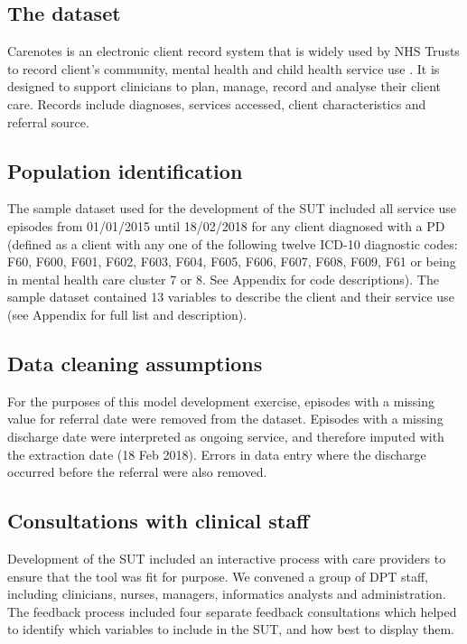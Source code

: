\documentclass{article}
\begin{document}
\subsection{The dataset}

Carenotes is an electronic client record system that is widely used by NHS Trusts to record client’s community, mental health and child health service use \cite{Advanced,BlueFrontier}. It is designed to support clinicians to plan, manage, record and analyse their client care. Records include diagnoses, services accessed, client characteristics and referral source.

\subsection{Population identification}
The sample dataset used for the development of the SUT included all service use episodes from 01/01/2015 until 18/02/2018 for any client diagnosed with a PD (defined as a client with any one of the following twelve ICD-10 diagnostic codes: F60, F600, F601, F602, F603, F604, F605, F606, F607, F608, F609, F61 or being in mental health care cluster 7 or 8. See Appendix for code descriptions). The sample dataset contained 13 variables to describe the client and their service use (see Appendix for full list and description). 

\subsection{Data cleaning assumptions}
For the purposes of this model development exercise, episodes with a missing value for referral date were removed from the dataset. Episodes with a missing discharge date were interpreted as ongoing service, and therefore imputed with the extraction date (18 Feb 2018). Errors in data entry where the discharge occurred before the referral were also removed.

\subsection{Consultations with clinical staff}
Development of the SUT included an interactive process with care providers to ensure that the tool was fit for purpose. We convened a group of DPT staff, including clinicians, nurses, managers, informatics analysts and administration. The feedback process included four separate feedback consultations which helped to identify which variables to include in the SUT, and how best to display them.
\end{document}
